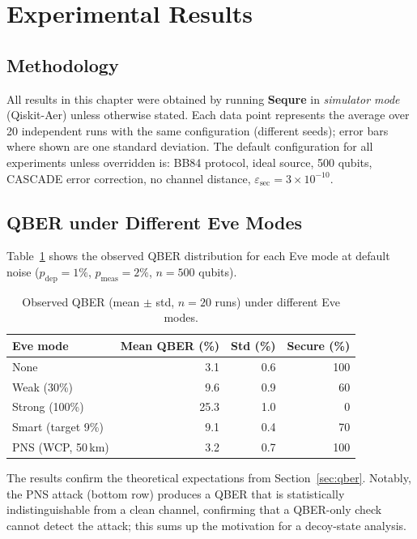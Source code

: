 \documentclass[12pt, a4paper]{article}
\begin{document}
\section{Experimental Results}
\label{sec:results}

\subsection{Methodology}
\label{sec:methodology}

All results in this chapter were obtained by running \textbf{Sequre} in
\emph{simulator mode} (Qiskit-Aer) unless otherwise stated. Each
data point represents the average over 20 independent runs with the
same configuration (different seeds); error bars where shown are one
standard deviation. The default configuration for all experiments unless
overridden is: BB84 protocol, ideal source, 500 qubits, CASCADE error
correction, no channel distance, $\varepsilon_\mathrm{sec} = 3 \times
10^{-10}$.

\subsection{QBER under Different Eve Modes}
\label{sec:qber-results}

Table~\ref{tab:qber-eve} shows the observed QBER distribution for each
Eve mode at default noise ($p_\mathrm{dep} = 1\%$,
$p_\mathrm{meas} = 2\%$, $n = 500$ qubits).

\begin{table}[H]
  \centering
  \caption{Observed QBER (mean $\pm$ std, $n = 20$ runs) under different Eve modes.}
  \label{tab:qber-eve}
  \begin{tabular}{@{} l r r r @{}}
    \toprule
    \textbf{Eve mode} & \textbf{Mean QBER (\%)} & \textbf{Std (\%)} & \textbf{Secure (\%)} \\
    \midrule
    None     &  3.1 & 0.6 & 100 \\
    Weak (30\%)   &  9.6 & 0.9 &  60 \\
    Strong (100\%) & 25.3 & 1.0 &   0 \\
    Smart (target 9\%) &  9.1 & 0.4 &  70 \\
    PNS (WCP, 50\,km)  &  3.2 & 0.7 & 100 \\
    \bottomrule
  \end{tabular}
\end{table}

The results confirm the theoretical expectations from
Section~\ref{sec:qber}. Notably, the PNS attack (bottom row) produces
a QBER that is statistically indistinguishable from a clean channel, confirming that a QBER-only check cannot detect the attack; this sums up the motivation for a decoy-state analysis.
\end{document}
